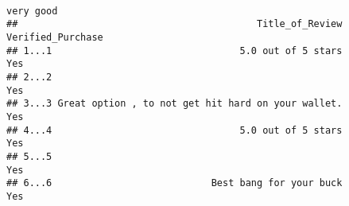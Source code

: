 \documentclass[
  11pt,
]{article}
\begin{document}
\begin{verbatim}
                                                                                                                                                                                                                                                                                                                                                                                                                                                                                                                                                                                                                                                                                                                                                                                                                                                                                                                                                                                                                                                                                                                                                                                                                                                                                                                very good
##                                          Title_of_Review Verified_Purchase
## 1...1                                 5.0 out of 5 stars               Yes
## 2...2                                                                  Yes
## 3...3 Great option , to not get hit hard on your wallet.               Yes
## 4...4                                 5.0 out of 5 stars               Yes
## 5...5                                                                  Yes
## 6...6                            Best bang for your buck               Yes
\end{verbatim}
\end{document}
